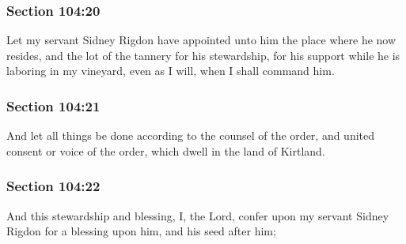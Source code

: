 	\subsubsection{Section 104:20} %
		\label{DC104-20}

		Let my servant Sidney Rigdon have appointed unto him the place where he now resides, and the lot of the tannery for his stewardship, for his support while he is laboring in my vineyard, even as I will, when I shall command him.


	\subsubsection{Section 104:21} %
		\label{DC104-21}

		And let all things be done according to the counsel of the order, and united consent or voice of the order, which dwell in the land of Kirtland.


	\subsubsection{Section 104:22} %
		\label{DC104-22}

		And this stewardship and blessing, I, the Lord, confer upon my servant Sidney Rigdon for a blessing upon him, and his seed after him;


